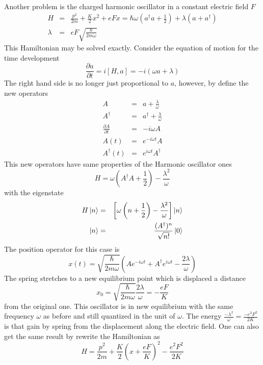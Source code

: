 Another problem is the charged harmonic oscillator in a constant electric field $F$
\begin{eqnarray}
    H &=& \frac{p^2}{2m} + \frac{K}{2} x^2 + eFx = \hbar \omega (a^\dagger a + \frac{1}{2} ) + \lambda(a+ a^\dagger)  \label{1.38} \\
    \lambda &=& eF \sqrt{ \frac{\hbar}{2m \omega} } \label{1.39}
\end{eqnarray}
This Hamiltonian may be solved exactly.
Consider the equation of motion for the time development
\begin{equation}
    \frac{\partial a}{\partial t} = i \left[ H, a\right] = - i \left( \omega a + \lambda \right)    \label{1.40}
\end{equation}
The right hand side is no longer just proportional to $a$, however, by define the new operators
\begin{eqnarray}
    A &=& a + \frac{\lambda}{\omega}  \label{1.41} \\
    A^\dagger &=& a^\dagger + \frac{\lambda}{ \omega}   \label{1.42} \\
    \frac{\partial A}{\partial t} &=& - i\omega A \label{1.43} \\
    A(t) &=& e^{-i \omega t} A    \label{1.44} \\
    A^\dagger (t) &=& e^{i\omega t} A^\dagger   \label{1.45}
\end{eqnarray}
This new operators have same properties of the Harmonic oscillator ones
\begin{equation}
    H = \omega \left( A^\dagger A + \frac{1}{2} \right) - \frac{\lambda^2}{\omega}  \label{1.50}
\end{equation}
with the eigenstate
\begin{eqnarray}
    H\ket{n} &=& \left[ \omega \left( n + \frac{1}{2} \right) - \frac{\lambda^2}{\omega} \right] \ket{n}    \label{1.51} \\
    \ket{n} &=& \frac{(A^\dagger)^n}{\sqrt{n!}} \ket{0} \label{1.52}
\end{eqnarray}
The position operator for this case is
\begin{equation}
    x(t) = \sqrt{ \frac{\hbar}{2m\omega} } \left( Ae^{-i\omega t} + A^\dagger e^{i\omega t} - \frac{2\lambda}{\omega} \right)   \label{1.53}
\end{equation}
The spring stretches to a new equilibrium point which is displaced a distance
\begin{equation}
    x_0 = \sqrt{ \frac{\hbar}{2m\omega} } \frac{2\lambda}{\omega} = - \frac{eF}{K} \label{1.54}
\end{equation}
from the original one.
This oscillator is in new equilibrium with the same frequency $\omega$ as before and still quantized in the unit of $\omega$.
The energy $ \frac{-\lambda^2}{\omega} = \frac{-e^2 F^2}{2K} $ is that gain by spring from the displacement along the electric field.
One can also get the same result by rewrite the Hamiltonian  as
\begin{equation}
    H = \frac{p^2}{2m} + \frac{K}{2} \left( x + \frac{eF}{K} \right)^2 - \frac{e^2F^2}{2K}  \label{1.55}
\end{equation}

